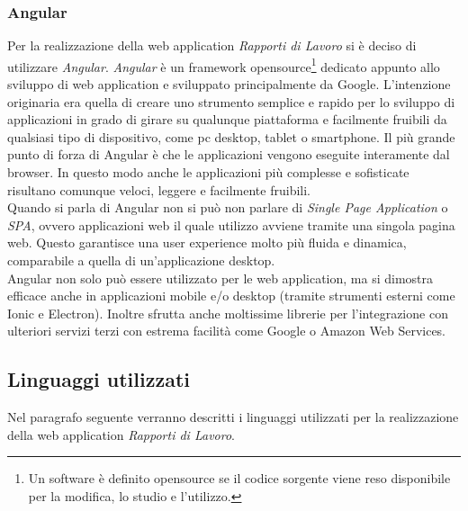   \subsubsection{Angular}
  Per la realizzazione della web application \textit{Rapporti di Lavoro} si è deciso di utilizzare 
  \textit{Angular}. \textit{Angular} è un framework opensource\footnote{Un software è definito opensource 
  se il codice sorgente viene reso disponibile per la modifica, lo studio e l'utilizzo.} dedicato appunto allo 
  sviluppo di web application e sviluppato principalmente da Google. L'intenzione originaria era quella di creare uno 
  strumento semplice e rapido per lo sviluppo di applicazioni in grado di girare su qualunque piattaforma e facilmente fruibili da 
  qualsiasi tipo di dispositivo, come pc desktop, tablet o smartphone. Il più grande punto di forza di Angular è che 
  le applicazioni vengono eseguite interamente dal browser. In questo modo anche le applicazioni più complesse e sofisticate 
  risultano comunque veloci, leggere e facilmente fruibili.\\
  Quando si parla di Angular non si può non parlare di \textit{Single Page Application} o \textit{SPA}, ovvero applicazioni web il quale utilizzo avviene 
  tramite una singola pagina web. Questo garantisce una user experience molto più fluida e dinamica, comparabile a quella di un'applicazione 
  desktop.\\
  Angular non solo può essere utilizzato per le web application, ma si dimostra efficace anche  
  in applicazioni mobile e/o desktop (tramite strumenti esterni come Ionic e Electron). Inoltre sfrutta 
  anche moltissime librerie per l'integrazione con ulteriori servizi terzi con estrema facilità
  come Google o Amazon Web Services.

  \subsection{Linguaggi utilizzati}
  Nel paragrafo seguente verranno descritti i linguaggi utilizzati per la realizzazione della web application \textit{Rapporti di Lavoro}.
